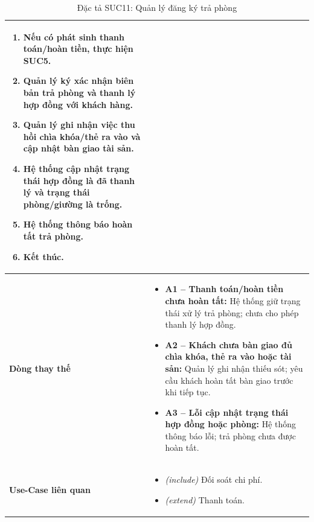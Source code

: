 \begin{table}[H]
\begin{tabularx}{\textwidth}{|>{\centering\arraybackslash\bfseries}m{3.5cm}|X|}
\begin{enumerate}[leftmargin=*, nosep]
        \item Nếu có phát sinh thanh toán/hoàn tiền, thực hiện \textbf{SUC5}.
        \item Quản lý ký xác nhận biên bản trả phòng và thanh lý hợp đồng với khách hàng.
        \item Quản lý ghi nhận việc thu hồi chìa khóa/thẻ ra vào và cập nhật bàn giao tài sản.
        \item Hệ thống cập nhật trạng thái hợp đồng là đã thanh lý và trạng thái phòng/giường là trống.
        \item Hệ thống thông báo hoàn tất trả phòng.
        \item Kết thúc.
    \end{enumerate} \\
    \hline
    Dòng thay thế &
    \begin{itemize}[leftmargin=*, nosep, label=-]
        \vspace{0.1cm}
        \item \textbf{A1 -- Thanh toán/hoàn tiền chưa hoàn tất:} Hệ thống giữ trạng thái xử lý trả phòng; chưa cho phép thanh lý hợp đồng.
        \item \textbf{A2 -- Khách chưa bàn giao đủ chìa khóa, thẻ ra vào hoặc tài sản:} Quản lý ghi nhận thiếu sót; yêu cầu khách hoàn tất bàn giao trước khi tiếp tục.
        \item \textbf{A3 -- Lỗi cập nhật trạng thái hợp đồng hoặc phòng:} Hệ thống thông báo lỗi; trả phòng chưa được hoàn tất.
    \end{itemize} \\
    \hline
    Use-Case liên quan &
    \begin{itemize}[leftmargin=*, nosep, label=-]
        \vspace{0.1cm}
        \item \textit{(include)} Đối soát chi phí.
        \item \textit{(extend)} Thanh toán.
\end{itemize} \\
    \hline
\end{tabularx}
\caption{Đặc tả SUC11: Quản lý đăng ký trả phòng}
\end{table}


\vspace{1cm}

